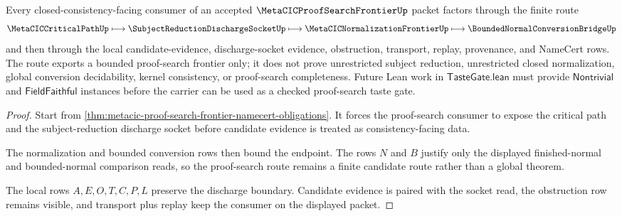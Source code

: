 \begin{theorem}
\label{thm:metacic-proof-search-frontier-discharge-boundary}
Every closed-consistency-facing consumer of an accepted $\MetaCICProofSearchFrontierUp$ packet factors through the finite route
$$
\MetaCICCriticalPathUp \longmapsto \SubjectReductionDischargeSocketUp \longmapsto \MetaCICNormalizationFrontierUp \longmapsto \BoundedNormalConversionBridgeUp
$$
and then through the local candidate-evidence, discharge-socket evidence, obstruction, transport, replay, provenance, and NameCert rows. The route exports a bounded proof-search frontier only; it does not prove unrestricted subject reduction, unrestricted closed normalization, global conversion decidability, kernel consistency, or proof-search completeness. Future Lean work in $\mathsf{TasteGate.lean}$ must provide $\mathsf{Nontrivial}$ and $\mathsf{FieldFaithful}$ instances before the carrier can be used as a checked proof-search taste gate.
\end{theorem}
\begin{proof}
Start from \autoref{thm:metacic-proof-search-frontier-namecert-obligations}. It forces the proof-search consumer to expose the critical path and the subject-reduction discharge socket before candidate evidence is treated as consistency-facing data.

The normalization and bounded conversion rows then bound the endpoint. The rows $N$ and $B$ justify only the displayed finished-normal and bounded-normal comparison reads, so the proof-search route remains a finite candidate route rather than a global theorem.

The local rows $A,E,O,T,C,P,L$ preserve the discharge boundary. Candidate evidence is paired with the socket read, the obstruction row remains visible, and transport plus replay keep the consumer on the displayed packet.
\end{proof}

\begin{closurestatus}{\MetaCICProofSearchFrontierUp}
  \theoryclosure{\seedClosure}
  \formalstatus{\unformalizedV}
\end{closurestatus}
